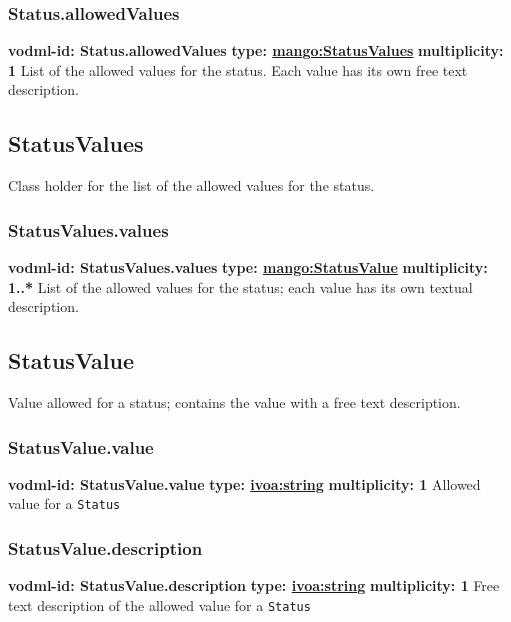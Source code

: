     \subsubsection{Status.allowedValues}
    \textbf{vodml-id: Status.allowedValues} \newline
    \textbf{type: \hyperref[sect:StatusValues]{mango:StatusValues}} \newline
    \textbf{multiplicity: 1} \newline
    List of the allowed values for the status. Each value has its own free text description.

  \subsection{StatusValues}
    \label{sect:StatusValues}
    Class holder for the list of the allowed values for the status.

    \subsubsection{StatusValues.values}
    \textbf{vodml-id: StatusValues.values} \newline
    \textbf{type: \hyperref[sect:StatusValue]{mango:StatusValue}} \newline
    \textbf{multiplicity: 1..*} \newline
    List of the allowed values for the status; each value has its own textual description.

  \subsection{StatusValue}
    \label{sect:StatusValue}
    Value allowed for a status; contains the value with a free text description.

    \subsubsection{StatusValue.value}
    \textbf{vodml-id: StatusValue.value} \newline
    \textbf{type: \hyperref[sect:ivoa]{ivoa:string}} \newline
    \textbf{multiplicity: 1} \newline
    Allowed value for a \texttt{Status}

    \subsubsection{StatusValue.description}
    \textbf{vodml-id: StatusValue.description} \newline
    \textbf{type: \hyperref[sect:ivoa]{ivoa:string}} \newline
    \textbf{multiplicity: 1} \newline
    Free text description of the allowed value for a \texttt{Status}

